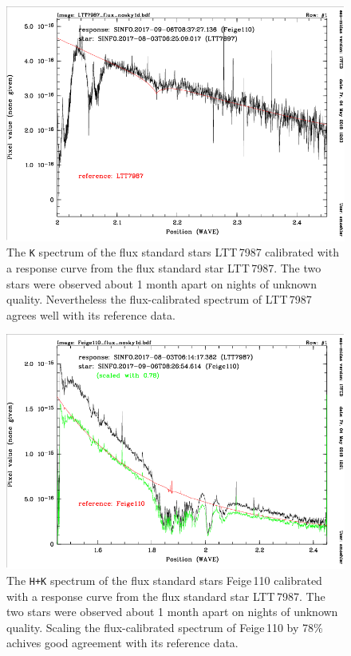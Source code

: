 \begin{figure}[H]
\centering \subfigure
\includegraphics[width=16cm]{figures/LTT7987_K.png} 
\caption[]
	{\footnotesize  The {\tt K} spectrum of the flux standard stars
          LTT\,7987 calibrated with a response curve from the flux
          standard star LTT\,7987. The two stars were observed about 1
          month apart on nights of unknown quality. Nevertheless the
          flux-calibrated spectrum of LTT\,7987 agrees well with its
          reference data.} 
	\label{fig:LTT7987_K}
\end{figure}

\begin{figure}[H]
\centering \subfigure
\includegraphics[width=16cm]{figures/Feige110_HK.png} 
\caption[]
	{\footnotesize  The {\tt H+K} spectrum of the flux standard stars
          Feige\,110 calibrated with a response curve from the flux
          standard star LTT\,7987. The two stars were observed about 1
          month apart on nights of unknown quality. Scaling the
          flux-calibrated spectrum of Feige\,110 by 78\% achives good
          agreement with its reference data.}
	\label{fig:Feige110_HK}
\end{figure}

